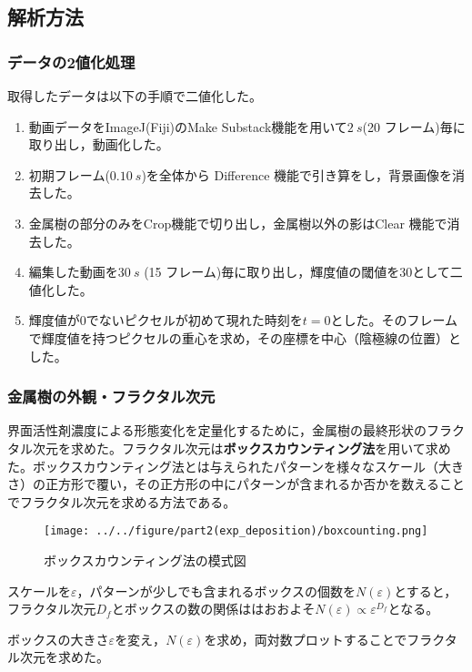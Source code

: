 \documentclass[autodetect-engine,dvi=dvipdfmx,a4paper,ja=standard,oneside,openany,11pt,draft]{bxjsbook}
\begin{document}
\subsection{解析方法}
\subsubsection{データの2値化処理}
取得したデータは以下の手順で二値化した。
\begin{enumerate}
  \item 動画データをImageJ(Fiji)のMake Substack機能を用いて$\SI{2}{s}$(20 フレーム)毎に取り出し，動画化した。
  \item 初期フレーム($\SI{0.10}{s}$)を全体から Difference 機能で引き算をし，背景画像を消去した。
  \item 金属樹の部分のみをCrop機能で切り出し，金属樹以外の影はClear 機能で消去した。
  \item 編集した動画を$\SI{30}{s}$ (15 フレーム)毎に取り出し，輝度値の閾値を30として二値化した。
  \item 輝度値が0でないピクセルが初めて現れた時刻を$t=0$とした。そのフレームで輝度値を持つピクセルの重心を求め，その座標を中心（陰極線の位置）とした。
\end{enumerate}

\subsubsection{金属樹の外観・フラクタル次元}
界面活性剤濃度による形態変化を定量化するために，金属樹の最終形状のフラクタル次元を求めた。フラクタル次元は\textbf{ボックスカウンティング法}を用いて求めた。ボックスカウンティング法とは与えられたパターンを様々なスケール（大きさ）の正方形で覆い，その正方形の中にパターンが含まれるか否かを数えることでフラクタル次元を求める方法である。
\begin{figure}[H]
  \centering
  \texttt{[image: ../../figure/part2(exp\_deposition)/boxcounting.png]}
  \caption{ボックスカウンティング法の模式図\cite{表面粗さ曲線のフラクタル解析}}
  \label{fig:box_counting}
\end{figure}
スケールを$\varepsilon$，パターンが少しでも含まれるボックスの個数を$N(\varepsilon)$とすると，フラクタル次元$D_f$とボックスの数の関係ははおおよそ$N(\varepsilon)\propto\varepsilon^{D_f}$となる。

ボックスの大きさ$\varepsilon$を変え，$N(\varepsilon)$を求め，両対数プロットすることでフラクタル次元を求めた。
\end{document}
